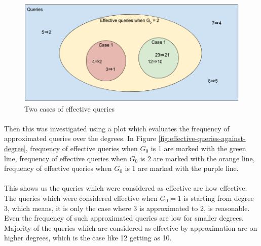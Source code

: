 \documentclass[12pt]{report}
\numberwithin{figure}{section}
\numberwithin{table}{section}
\begin{document}
\begin{figure}[H]
\centering
\includegraphics[scale=0.4]{images/Effective-queries-when-G-is-2}
\caption{Two cases of effective queries}
\end{figure}

\paragraph{}

Then this was investigated using a plot which evaluates the frequency of approximated queries over the degrees. In Figure \ref{fig:effective-queries-against-degree}, frequency of effective queries when $G_0$ is 1 are marked with the green line, frequency of effective queries when $G_0$ is 2 are marked with the orange line, frequency of effective queries when $G_0$ is 1 are marked with the purple line. 

\paragraph{}

This shows us the queries which were considered as effective are how effective. The queries which were considered effective when $G_0 = 1$ is starting from degree 3, which means, it is only the case where 3 is approximated to 2, is reasonable. Even the frequency of such approximated queries are low for smaller degrees. Majority of the queries which are considered as effective by approximation are on higher degrees, which is the case like 12 getting as 10.
\end{document}
